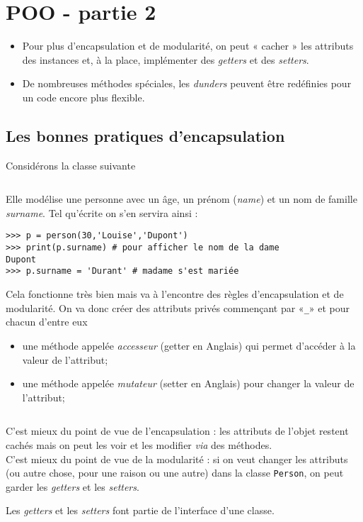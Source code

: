 \documentclass[a4paper,10pt,cours,firamath]{nsi}
\begin{document}
\chapter{POO - partie 2}
\begin{aretenir}
	\begin{itemize}
		\item 	Pour plus d'encapsulation et de modularité, on peut « cacher » les attributs des instances et, à la place, implémenter des \textit{getters} et des \textit{setters}.
		\item 	De nombreuses méthodes spéciales, les \textit{dunders} peuvent être redéfinies pour un code encore plus flexible.
	\end{itemize}
\end{aretenir}
\section{Les bonnes pratiques d'encapsulation}
Considérons la classe suivante

\inputminted{python}{scripts/classe1.py}

Elle modélise une personne avec un âge, un prénom (\textit{name}) et un nom de famille \textit{surname}. Tel qu'écrite on s'en servira ainsi :
\begin{pyc}
	\begin{verbatim}
>>> p = person(30,'Louise','Dupont')
>>> print(p.surname) # pour afficher le nom de la dame
Dupont
>>> p.surname = 'Durant' # madame s'est mariée
\end{verbatim}
\end{pyc}
Cela fonctionne très bien mais va à l'encontre des règles d'encapsulation et de modularité. On va donc créer des attributs privés commençant par «\texttt{\_}» et pour chacun d'entre eux 
\begin{itemize}
	\item 	une méthode appelée \textit{accesseur} (getter en Anglais) qui permet d'accéder à la valeur de l'attribut;
	\item 	une méthode appelée \textit{mutateur} (setter en Anglais) pour changer la valeur de l'attribut;
\end{itemize}
\inputminted{python}{scripts/classe2.py}

C'est mieux du point de vue de l'encapsulation : les attributs de l'objet restent cachés mais on peut les voir et les modifier \textit{via} des méthodes.\\
C'est mieux du point de vue de la modularité : si on veut changer les attributs (ou autre chose, pour une raison ou une autre) dans la classe \texttt{Person}, on peut garder les \textit{getters} et les \textit{setters}.
\begin{remarque}[]
	Les \textit{getters} et les \textit{setters} font partie de l'interface d'une classe.
\end{remarque}
\end{document}
